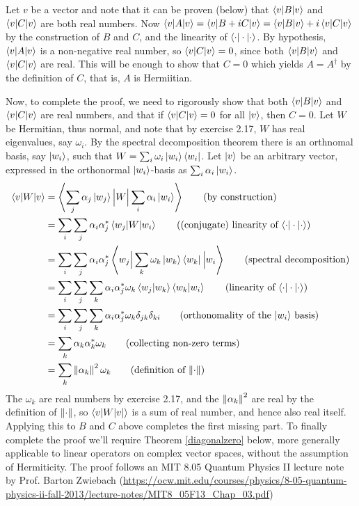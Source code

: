 Let $v$ be a vector and note that it can be proven (below) that $\braket{v | B | v}$ and $\braket{v | C | v}$  are both real numbers.    Now $\braket{v|A|v} = \braket{v|B+iC|v} = \braket{v|B|v} + i\braket{v|C|v}$ by the construction of $B$ and $C$, and the linearity of $\braket{\cdot|\cdot|\cdot}$.  By hypothesis, $\braket{v|A|v}$ is a non-negative real number, so $\braket{v|C|v} = 0$, since both $\braket{v | B | v}$ and $\braket{v | C | v}$  are real.  This will be enough to show that $C=0$ which yields $A=A^\dagger$ by the definition of $C$, that is, $A$ is Hermiitian.

Now, to complete the proof, we need to rigorously show that both $\braket{v | B | v}$ and $\braket{v | C | v}$ are real numbers, and that if $\braket{v|C|v}=0$ for all $\ket{v}$, then $C = 0$. 
Let $W$ be Hermitian, thus normal, and note that by exercise 2.17, $W$ has real eigenvalues, say $\omega_i$.  By the spectral decomposition theorem there is an orthnomal basis, say $\ket{w_i}$, such that $W=\sum_i \omega_i\ket{w_i}\bra{w_i}$.  Let $\ket{v}$ be an arbitrary vector, expressed in the orthonormal $\ket{w_i}$-basis as $\sum_i \alpha_i\ket{w_i}$.
\begin{align*}
	\braket{v | W | v}  &= \left\langle\sum_j\alpha_j\ket{w_j} \Big\lvert  W \Big\rvert \sum_i\alpha_i\ket{w_i}\right\rangle \tag{by construction}\\
		&= \sum_i \sum_j \alpha_i\alpha_j^*\braket{w_j|W|w_i} \tag{(conjugate) linearity of $\braket{\cdot|\cdot|\cdot}$} \\
		&= \sum_i\sum_j \alpha_i\alpha_j^*\left\langle w_j\Big\lvert\sum_k \omega_k\ket{w_k}\bra{w_k}\Big\rvert w_i\right\rangle  \tag{spectral decomposition}\\
		&= \sum_i\sum_j\sum_k\alpha_i\alpha_j^*\omega_k\braket{w_j|w_k}\braket{w_k|w_i} \tag{linearity of $\braket{\cdot|\cdot|\cdot}$} \\
		&= \sum_i\sum_j\sum_k\alpha_i\alpha_j^*\omega_k\delta_{jk}\delta_{ki} \tag{orthonomality of the $\ket{w_i}$  basis}  \\
		&= \sum_k\alpha_k\alpha_k^*\omega_k \tag{collecting non-zero terms}\\
		&= \sum_k\norm{\alpha_k}^2\omega_k \tag{definition of $\norm{\cdot}$}
\end{align*}
The $\omega_k$ are real numbers by exercise 2.17, and the $\left\lVert\alpha_k\right\rVert^2$ are real by the definition of $\left\lVert\cdot\right\rVert$, so $\braket{v|W|v|}$ is a sum of real number,  and hence also real itself.  Applying this to $B$ and $C$ above completes the first missing part.  To finally complete the proof we'll require Theorem \ref{diagonalzero} below, more generally applicable to linear operators on complex vector spaces, without the assumption of Hermiticity.  The proof follows an MIT 8.05 Quantum Physics II lecture note  by Prof. Barton Zwiebach (\url{https://ocw.mit.edu/courses/physics/8-05-quantum-physics-ii-fall-2013/lecture-notes/MIT8_05F13_Chap_03.pdf})

